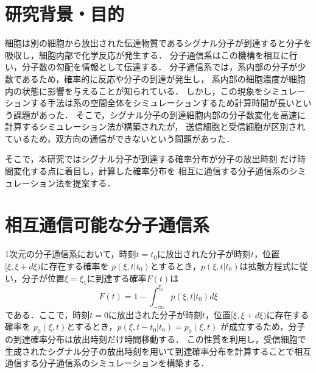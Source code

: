 \documentclass[twocolumn]{jarticle}
\begin{document}
\maketitle

\section{研究背景・目的}
細胞は別の細胞から放出された伝達物質であるシグナル分子が到達すると分子を吸収し，細胞内部で化学反応が発生する．
分子通信系はこの機構を相互に行い，分子数の勾配を情報として伝達する．
分子通信系では，系内部の分子が少数であるため，確率的に反応や分子の到達が発生し，
系内部の細胞濃度が細胞内の状態に影響を与えることが知られている\cite{Yamagishi}．
しかし，この現象をシミュレーションする手法は系の空間全体をシミュレーションするため計算時間が長いという課題があった．
そこで，シグナル分子の到達細胞内部の分子数変化を高速に計算するシミュレーション法\cite{hara}が構築されたが，
送信細胞と受信細胞が区別されているため，双方向の通信ができないという問題があった．

そこで，本研究ではシグナル分子が到達する確率分布が分子の放出時刻
だけ時間変化する点に着目し，計算した確率分布を
相互に通信する分子通信系のシミュレーション法を提案する．

\section{相互通信可能な分子通信系}
1次元の分子通信系において，時刻$t=t_0$に放出された分子が時刻$t$，位置$[\xi,\xi+d\xi)$に存在する確率を
$p(\xi,t|t_0)$とするとき，$p(\xi,t|t_0)$は拡散方程式に従い，分子が位置$\xi =\xi_1$に到達する確率$F(t)$は
\begin{equation}
    F(t) = 1- \int_{-\infty}^{\xi_1} p(\xi,t|t_0)d\xi
\end{equation}
である．ここで，時刻$t=0$に放出された分子が時刻$t$，位置$[\xi,\xi+d\xi)$に存在する確率を
$p_0(\xi,t)$とするとき，$p(\xi,t-t_0|t_0)=$$p_0(\xi,t)$
が成立するため，分子の到達確率分布は放出時刻だけ時間移動する．
この性質を利用し，受信細胞で生成されたシグナル分子の放出時刻を用いて到達確率分布を計算することで相互通信する分子通信系のシミュレーションを構築する．
\end{document}
